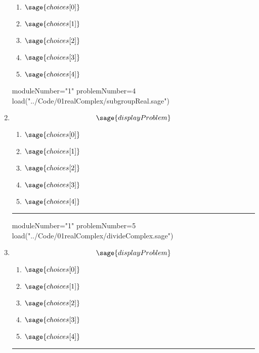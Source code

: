 \documentclass[14pt]{extbook}
\newcommand{\litem}[1]{\item#1\hspace*{-1cm}\rule{\textwidth}{0.4pt}}
\begin{document}
\begin{enumerate}
{  	\begin{enumerate}[label=\Alph*.]
    \item \( \sage{choices[0]} \)
    \item \( \sage{choices[1]} \)
    \item \( \sage{choices[2]} \)
    \item \( \sage{choices[3]} \)
    \item \( \sage{choices[4]} \)
  	\end{enumerate}
  }
\begin{sagesilent}
moduleNumber="1"
problemNumber=4
load("../Code/01realComplex/subgroupReal.sage")
\end{sagesilent}

\litem{ 

   \[ \sage{displayProblem} \]

  	\begin{enumerate}[label=\Alph*.]
    \item \( \sage{choices[0]} \)
    \item \( \sage{choices[1]} \)
    \item \( \sage{choices[2]} \)
    \item \( \sage{choices[3]} \)
    \item \( \sage{choices[4]} \)
  	\end{enumerate}
  }
\begin{sagesilent}
moduleNumber="1"
problemNumber=5
load("../Code/01realComplex/divideComplex.sage")
\end{sagesilent}

\litem{ 

   \[ \sage{displayProblem} \]

  	\begin{enumerate}[label=\Alph*.]
    \item \( \sage{choices[0]} \)
    \item \( \sage{choices[1]} \)
    \item \( \sage{choices[2]} \)
    \item \( \sage{choices[3]} \)
    \item \( \sage{choices[4]} \)
  	\end{enumerate}
  }

\end{enumerate}
\end{document}
